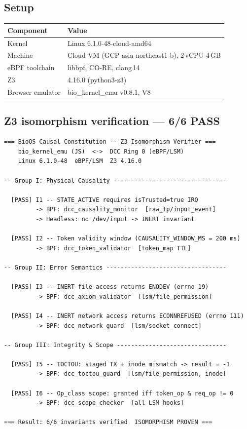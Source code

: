 \documentclass[11pt,a4paper,twoside]{article}
\begin{document}
\subsection{Setup}

\begin{table}[H]
\centering
\begin{tabular}{@{}ll@{}}
\toprule
\textbf{Component} & \textbf{Value} \\ \midrule
Kernel             & Linux 6.1.0-48-cloud-amd64 \\
Machine            & Cloud VM (GCP asia-northeast1-b), 2\,vCPU 4\,GB \\
eBPF toolchain     & libbpf, CO-RE, clang\,14 \\
Z3                 & 4.16.0 (python3-z3) \\
Browser emulator   & bio\_kernel\_emu v0.8.1, V8 \\
\bottomrule
\end{tabular}
\end{table}

\subsection{Z3 isomorphism verification --- 6/6 PASS}

\begin{lstlisting}[style=shellstyle,caption={Z3 verifier output, Z3 4.16.0}]
=== BioOS Causal Constitution -- Z3 Isomorphism Verifier ===
    bio_kernel_emu (JS)  <->  DCC Ring 0 (eBPF/LSM)
    Linux 6.1.0-48  eBPF/LSM  Z3 4.16.0

-- Group I: Physical Causality --------------------------------

  [PASS] I1 -- STATE_ACTIVE requires isTrusted=true IRQ
         -> BPF: dcc_causality_monitor  [raw_tp/input_event]
         -> Headless: no /dev/input -> INERT invariant

  [PASS] I2 -- Token validity window (CAUSALITY_WINDOW_MS = 200 ms)
         -> BPF: dcc_token_validator  [token_map TTL]

-- Group II: Error Semantics ----------------------------------

  [PASS] I3 -- INERT file access returns ENODEV (errno 19)
         -> BPF: dcc_axiom_validator  [lsm/file_permission]

  [PASS] I4 -- INERT network access returns ECONNREFUSED (errno 111)
         -> BPF: dcc_network_guard  [lsm/socket_connect]

-- Group III: Integrity & Scope -------------------------------

  [PASS] I5 -- TOCTOU: staged TX + inode mismatch -> result = -1
         -> BPF: dcc_toctou_guard  [lsm/file_permission, inode]

  [PASS] I6 -- Op_class scope: granted iff token_op & req_op != 0
         -> BPF: dcc_scope_checker  [all LSM hooks]

=== Result: 6/6 invariants verified  ISOMORPHISM PROVEN ===
\end{lstlisting}
\end{document}
